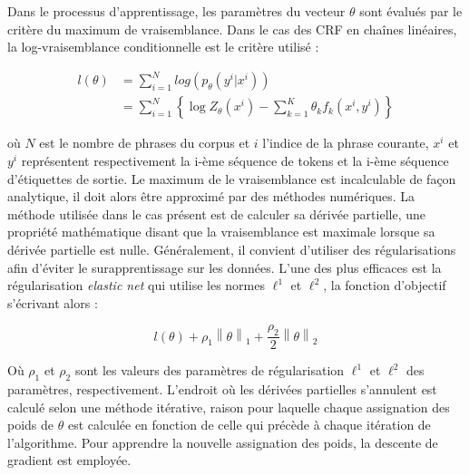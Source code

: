 \documentclass[12pt,a4paper,times,twoside,openright]{report}
\begin{document}
Dans le processus d'apprentissage, les paramètres du vecteur $\theta$ sont évalués par le critère du maximum de vraisemblance. Dans le cas des CRF en chaînes linéaires, la log-vraisemblance conditionnelle \citep{Lafferty01} est le critère utilisé :

\begin{equation} \label{eq:log-likelihood}
\begin{aligned}
l(\theta) &= \sum_{i=1}^{N} log(p_{\theta}(y^{i}|x^{i})) \\
          &= \sum_{i=1}^{N} \left \{ \log Z_{\theta}(x^{i}) - \sum_{k=1}^{K} \theta_{k}f_{k}(x^{i}, y^{i}) \right \}
\end{aligned}
\end{equation}

où $N$ est le nombre de phrases du corpus et $i$ l'indice de la phrase courante, $x^{i}$ et $y^{i}$ représentent respectivement la i-ème séquence de tokens et la i-ème séquence d'étiquettes de sortie. Le maximum de le vraisemblance est incalculable de façon analytique, il doit alors être approximé par des méthodes numériques. La méthode utilisée dans le cas présent est de calculer sa dérivée partielle, une propriété mathématique disant que la vraisemblance est maximale lorsque sa dérivée partielle est nulle. Généralement, il convient d'utiliser des régularisations afin d'éviter le surapprentissage sur les données. L'une des plus efficaces est la régularisation \emph{elastic net} \citep{zou2005regularization} qui utilise les normes $\ell^{1}$ et $\ell^{2}$, la fonction d'objectif s'écrivant alors :

\begin{equation} \label{eq:penalised-log-likelihood}
l(\theta) + \rho_{1} \left \| \theta \right \|_{1} + \frac{\rho_{2}}{2} \left \| \theta \right \|_{2}
\end{equation}

Où $\rho_{1}$ et $\rho_{2}$ sont les valeurs des paramètres de régularisation $\ell^{1}$ et $\ell^{2}$ des paramètres, respectivement. L'endroit où les dérivées partielles s'annulent est calculé selon une méthode itérative, raison pour laquelle chaque assignation des poids de $\theta$ est calculée en fonction de celle qui précède à chaque itération de l'algorithme. Pour apprendre la nouvelle assignation des poids, la descente de gradient \citep{Lafferty01} est employée.


        
\end{document}

